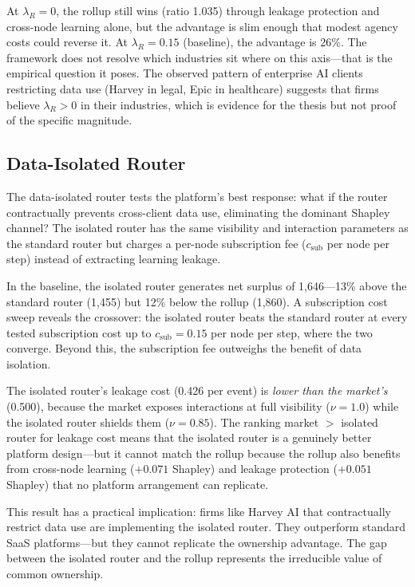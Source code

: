 \documentclass[12pt]{article}
\theoremstyle{definition}
\begin{document}
\noindent At $\lambda_R = 0$, the rollup still wins (ratio 1.035) through leakage protection and cross-node learning alone, but the advantage is slim enough that modest agency costs could reverse it. At $\lambda_R = 0.15$ (baseline), the advantage is 26\%. The framework does not resolve which industries sit where on this axis---that is the empirical question it poses. The observed pattern of enterprise AI clients restricting data use (Harvey in legal, Epic in healthcare) suggests that firms believe $\lambda_R > 0$ in their industries, which is evidence for the thesis but not proof of the specific magnitude.

\subsection{Data-Isolated Router}
\label{sec:isolated}

The data-isolated router tests the platform's best response: what if the router contractually prevents cross-client data use, eliminating the dominant Shapley channel? The isolated router has the same visibility and interaction parameters as the standard router but charges a per-node subscription fee ($c_{\text{sub}}$ per node per step) instead of extracting learning leakage.

In the baseline, the isolated router generates net surplus of 1,646---13\% above the standard router (1,455) but 12\% below the rollup (1,860). A subscription cost sweep reveals the crossover: the isolated router beats the standard router at every tested subscription cost up to $c_{\text{sub}} = 0.15$ per node per step, where the two converge. Beyond this, the subscription fee outweighs the benefit of data isolation.

The isolated router's leakage cost (0.426 per event) is \textit{lower than the market's} (0.500), because the market exposes interactions at full visibility ($\nu = 1.0$) while the isolated router shields them ($\nu = 0.85$). The ranking market $>$ isolated router for leakage cost means that the isolated router is a genuinely better platform design---but it cannot match the rollup because the rollup also benefits from cross-node learning ($+0.071$ Shapley) and leakage protection ($+0.051$ Shapley) that no platform arrangement can replicate.

This result has a practical implication: firms like Harvey AI that contractually restrict data use are implementing the isolated router. They outperform standard SaaS platforms---but they cannot replicate the ownership advantage. The gap between the isolated router and the rollup represents the irreducible value of common ownership.
\end{document}
